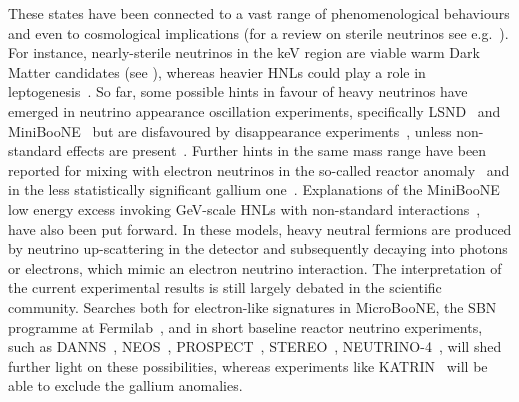 These states have been connected to a vast range of phenomenological behaviours and %
even to cosmological implications (for a review on sterile neutrinos see e.g.\ ).
For instance, nearly-sterile neutrinos in the keV region are viable warm Dark Matter candidates (see \eg {}), %
whereas heavier HNLs could play a role in leptogenesis~\cite{Fukugita:1986hr, Covi:1996wh, Pilaftsis:1997jf}.
So far, some possible hints in favour of heavy neutrinos have emerged in neutrino appearance oscillation experiments, %
specifically LSND~\cite{Aguilar:2001ty} and MiniBooNE~\cite{Aguilar-Arevalo:2012fmn, Aguilar-Arevalo:2013pmq, Aguilar-Arevalo:2018gpe} %
but are disfavoured by disappearance experiments~\cite{TheIceCube:2016oqi, Adamson:2017uda, Aartsen:2017bap}, %
unless non-standard effects are present~\cite{Liao:2016reh, Liao:2018mbg, Esmaili:2018qzu, Denton:2018dqq}.
Further hints in the same mass range have been reported for mixing with electron neutrinos in the %
so-called reactor anomaly~\cite{Mueller:2011nm, Mention:2011rk, Huber:2011wv, Ko:2016owz, Alekseev:2018efk} %
and in the less statistically significant gallium one~\cite{Abdurashitov:2005tb, Laveder:2007zz, Giunti:2006bj}.
Explanations of the MiniBooNE low energy excess invoking GeV-scale HNLs with non-standard %
interactions~\cite{Gninenko:2009ks, Gninenko:2010pr, Masip:2012ke, Bertuzzo:2018itn, Ballett:2018ynz}, %
have also been put forward.
In these models, heavy neutral fermions are produced by neutrino up-scattering in the detector %
and subsequently decaying into photons or electrons, which mimic an electron neutrino interaction.
The interpretation of the current experimental results is still largely debated in the scientific community.
Searches both for electron-like signatures in MicroBooNE, the SBN programme at Fermilab~\cite{Antonello:2015lea}, %
and in short baseline reactor neutrino experiments, such as DANNS~\cite{Alekseev:2018efk}, NEOS~\cite{Ko:2016owz}, %
PROSPECT~\cite{Ashenfelter:2018iov}, STEREO~\cite{Almazan:2018wln}, \mbox{NEUTRINO-4}~\cite{Serebrov:2018vdw}, %
will shed further light on these possibilities, %
whereas experiments like KATRIN~\cite{Mertens:2018vuu} will be able to exclude the gallium anomalies.

